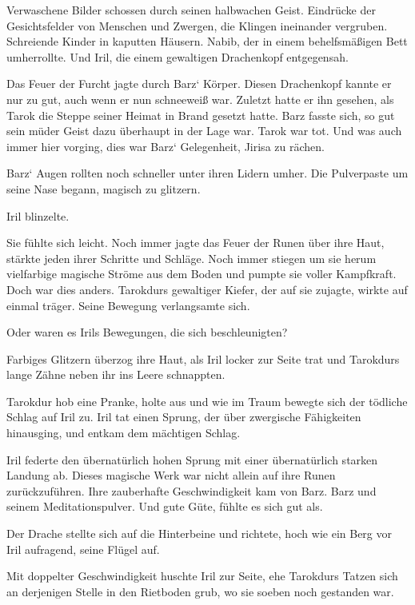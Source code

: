 Verwaschene Bilder schossen durch seinen halbwachen Geist. Eindrücke der Gesichtsfelder von Menschen und Zwergen, die Klingen ineinander vergruben. Schreiende Kinder in kaputten Häusern. Nabib, der in einem behelfsmäßigen Bett umherrollte. Und Iril, die einem gewaltigen Drachenkopf entgegensah.

Das Feuer der Furcht jagte durch Barz‘ Körper. Diesen Drachenkopf kannte er nur zu gut, auch wenn er nun schneeweiß war. Zuletzt hatte er ihn gesehen, als Tarok die Steppe seiner Heimat in Brand gesetzt hatte. Barz fasste sich, so gut sein müder Geist dazu überhaupt in der Lage war. Tarok war tot. Und was auch immer hier vorging, dies war Barz‘ Gelegenheit, Jirisa zu rächen.

Barz‘ Augen rollten noch schneller unter ihren Lidern umher. Die Pulverpaste um seine Nase begann, magisch zu glitzern.\bigskip







Iril blinzelte.

Sie fühlte sich leicht. Noch immer jagte das Feuer der Runen über ihre Haut, stärkte jeden ihrer Schritte und Schläge. Noch immer stiegen um sie herum vielfarbige magische Ströme aus dem Boden und pumpte sie voller Kampfkraft. Doch war dies anders. Tarokdurs gewaltiger Kiefer, der auf sie zujagte, wirkte auf einmal träger. Seine Bewegung verlangsamte sich.

Oder waren es Irils Bewegungen, die sich beschleunigten?

Farbiges Glitzern überzog ihre Haut, als Iril locker zur Seite trat und Tarokdurs lange Zähne neben ihr ins Leere schnappten.

Tarokdur hob eine Pranke, holte aus und wie im Traum bewegte sich der tödliche Schlag auf Iril zu. Iril tat einen Sprung, der über zwergische Fähigkeiten hinausging, und entkam dem mächtigen Schlag.

Iril federte den übernatürlich hohen Sprung mit einer übernatürlich starken Landung ab. Dieses magische Werk war nicht allein auf ihre Runen zurückzuführen. Ihre zauberhafte Geschwindigkeit kam von Barz. Barz und seinem Meditationspulver. Und gute Güte, fühlte es sich gut als.

Der Drache stellte sich auf die Hinterbeine und richtete, hoch wie ein Berg vor Iril aufragend, seine Flügel auf.

Mit doppelter Geschwindigkeit huschte Iril zur Seite, ehe Tarokdurs Tatzen sich an derjenigen Stelle in den Rietboden grub, wo sie soeben noch gestanden war.

